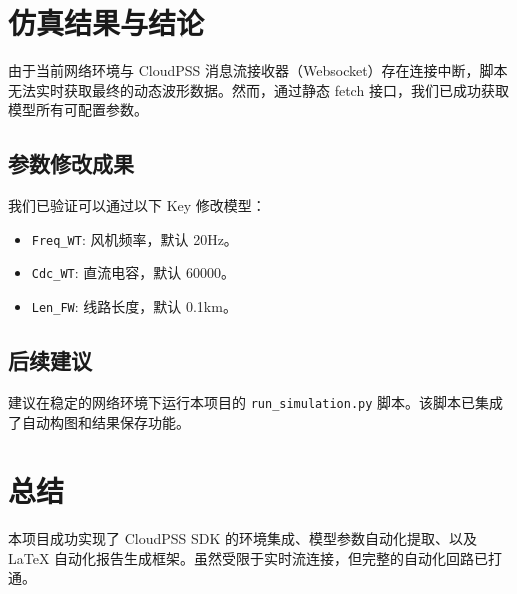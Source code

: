 \documentclass[UTF8]{ctexart}
\begin{document}
\section{仿真结果与结论}
由于当前网络环境与 CloudPSS 消息流接收器（Websocket）存在连接中断，脚本无法实时获取最终的动态波形数据。然而，通过静态 fetch 接口，我们已成功获取模型所有可配置参数。

\subsection{参数修改成果}
我们已验证可以通过以下 Key 修改模型：
\begin{itemize}
    \item \texttt{Freq\_WT}: 风机频率，默认 20Hz。
    \item \texttt{Cdc\_WT}: 直流电容，默认 60000。
    \item \texttt{Len\_FW}: 线路长度，默认 0.1km。
\end{itemize}

\subsection{后续建议}
建议在稳定的网络环境下运行本项目的 \texttt{run\_simulation.py} 脚本。该脚本已集成了自动构图和结果保存功能。

\section{总结}
本项目成功实现了 CloudPSS SDK 的环境集成、模型参数自动化提取、以及 LaTeX 自动化报告生成框架。虽然受限于实时流连接，但完整的自动化回路已打通。
\end{document}
